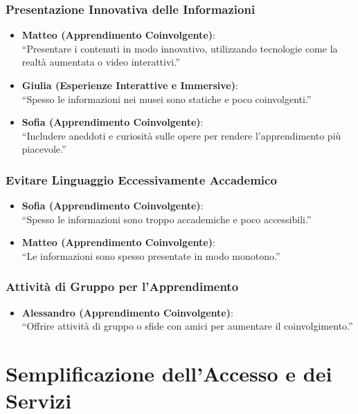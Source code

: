 \documentclass{article}
\begin{document}
\subsubsection{Presentazione Innovativa delle Informazioni}

\begin{itemize}
    \item \textbf{Matteo (Apprendimento Coinvolgente)}:\\
    ``Presentare i contenuti in modo innovativo, utilizzando tecnologie come la realtà aumentata o video interattivi.''
    \item \textbf{Giulia (Esperienze Interattive e Immersive)}:\\
    ``Spesso le informazioni nei musei sono statiche e poco coinvolgenti.''
    \item \textbf{Sofia (Apprendimento Coinvolgente)}:\\
    ``Includere aneddoti e curiosità sulle opere per rendere l'apprendimento più piacevole.''
\end{itemize}

\subsubsection{Evitare Linguaggio Eccessivamente Accademico}

\begin{itemize}
    \item \textbf{Sofia (Apprendimento Coinvolgente)}:\\
    ``Spesso le informazioni sono troppo accademiche e poco accessibili.''
    \item \textbf{Matteo (Apprendimento Coinvolgente)}:\\
    ``Le informazioni sono spesso presentate in modo monotono.''
\end{itemize}

\subsubsection{Attività di Gruppo per l'Apprendimento}

\begin{itemize}
    \item \textbf{Alessandro (Apprendimento Coinvolgente)}:\\
    ``Offrire attività di gruppo o sfide con amici per aumentare il coinvolgimento.''
\end{itemize}

\section{Semplificazione dell'Accesso e dei Servizi}
\end{document}

